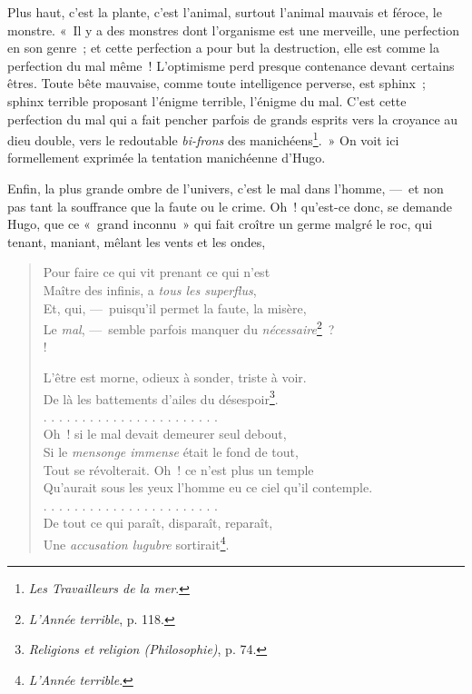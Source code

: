 \documentclass[french,twoside]{book} %
\begin{document}
\noindent Plus haut, c’est la plante, c’est l’animal, surtout l’animal mauvais et féroce, le monstre. « Il y a des monstres dont l’organisme est une merveille, une perfection en son genre ; et cette perfection a pour but la destruction, elle est comme la perfection du mal même ! L’optimisme perd presque contenance devant certains êtres. Toute bête mauvaise, comme toute intelligence perverse, est sphinx ; sphinx terrible proposant l’énigme terrible, l’énigme du mal. C’est cette perfection du mal qui a fait pencher parfois de grands esprits vers la croyance au dieu double, vers le redoutable \emph{bi-frons} des manichéens\footnote{\emph{Les Travailleurs de la mer}.}. » On voit ici formellement exprimée la tentation manichéenne d’Hugo.\par
Enfin, la plus grande ombre de l’univers, c’est le mal dans l’homme, — et non pas tant la souffrance que la faute ou le crime. Oh ! qu’est-ce donc, se demande Hugo, que ce « grand inconnu » qui fait croître un germe malgré le roc, qui tenant, maniant, mêlant les vents et les ondes,\par


\begin{verse}
Pour faire ce qui vit prenant ce qui n’est\\
Maître des infinis, a \emph{tous les superflus},\\
Et, qui, — puisqu’il permet la faute, la misère,\\
Le \emph{mal}, — semble parfois manquer du \emph{nécessaire}\footnote{\emph{L’Année terrible}, p. 118.} ?\\!

L’être est morne, odieux à sonder, triste à voir.\\
De là les battements d’ailes du désespoir\footnote{\emph{Religions et religion (Philosophie)}, p. 74.}.\\
. . . . . . . . . . . . . . . . . . . . . . .\\
Oh ! si le mal devait demeurer seul debout,\\
Si le \emph{mensonge immense} était le fond de tout,\\
Tout se révolterait. Oh ! ce n’est plus un temple\\
Qu’aurait sous les yeux l’homme eu ce ciel qu’il contemple.\\
. . . . . . . . . . . . . . . . . . . . . . .\\
De tout ce qui paraît, disparaît, reparaît,\\
Une \emph{accusation lugubre} sortirait\footnote{\emph{L’Année terrible}.}.\\
\end{verse}
\end{document}
